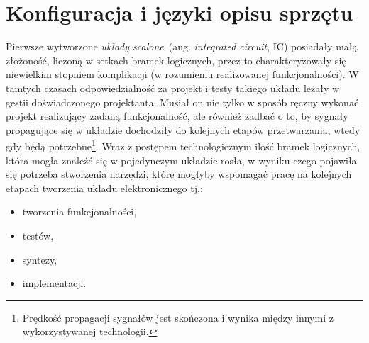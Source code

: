 \section{Konfiguracja i języki opisu sprzętu}
Pierwsze wytworzone \textit{układy scalone}~(ang. \textit{integrated circuit}, IC) posiadały małą złożoność, liczoną w setkach bramek logicznych, przez to charakteryzowały się niewielkim stopniem komplikacji (w rozumieniu realizowanej funkcjonalności). W tamtych czasach odpowiedzialność za projekt i testy takiego układu leżały w gestii doświadczonego projektanta. Musiał on nie tylko w sposób ręczny wykonać projekt realizujący zadaną funkcjonalność, ale również zadbać o to, by sygnały propagujące się w układzie dochodziły do kolejnych etapów przetwarzania, wtedy gdy będą potrzebne\footnote{Prędkość propagacji sygnałów jest skończona i wynika między innymi z wykorzystywanej technologii.}. Wraz z postępem technologicznym ilość bramek logicznych, która mogła znaleźć się w pojedynczym układzie rosła, w wyniku czego pojawiła się potrzeba stworzenia narzędzi, które mogłyby wspomagać pracę na kolejnych etapach tworzenia układu elektronicznego tj.:
\begin{itemize}
\item tworzenia funkcjonalności,
\item testów, 
\item syntezy,
\item implementacji. 
\end{itemize}
